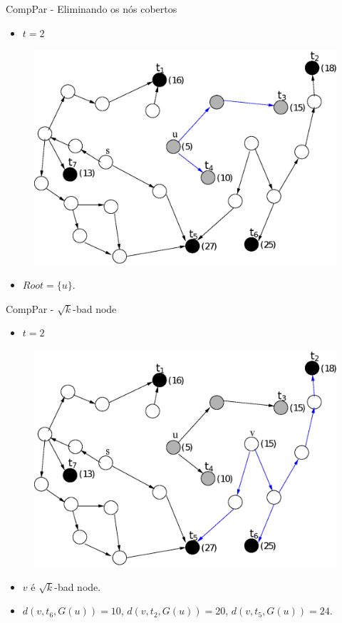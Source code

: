 \documentclass[10pt]{beamer}
\begin{document}
\begin{frame}{CompPar - Eliminando os nós cobertos}
\begin{itemize}
  \item $t = 2$
\end{itemize}
\begin{figure}[H]
\centering
\includegraphics[scale=0.45]{imagens/compPar_cov1}
\label{fig:fig}
\end{figure}
\begin{itemize}
  \item $Root = \{u\}$.
\end{itemize}
\end{frame}

\begin{frame}{CompPar - $\sqrt{k}$-bad node}
\begin{itemize}
  \item $t = 2$
\end{itemize}
\begin{figure}[H]
\centering
\includegraphics[scale=0.45]{imagens/compPar_bad2}
\label{fig:fig}
\end{figure}
\footnotesize
\begin{itemize}
  \item $v$ é $\sqrt{k}$-bad node.
  \item $d(v,t_6,G(u)) = 10$, $d(v,t_2,G(u)) = 20$, $d(v,t_5,G(u)) = 24$.
\end{itemize}
\end{frame}
\end{document}
